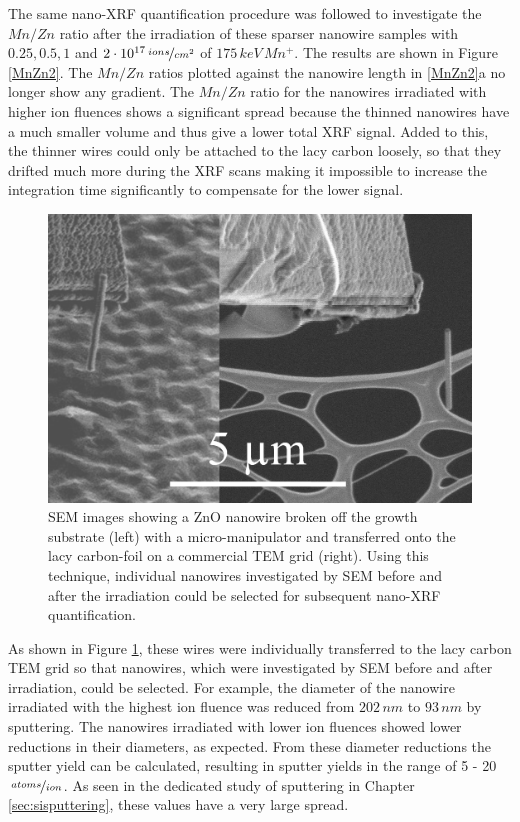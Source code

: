 The same nano-XRF quantification procedure was followed to investigate the $Mn/Zn$ ratio after the irradiation of these sparser nanowire samples with $0.25, 0.5, 1$ and $2\cdot 10^{17}\,\nicefrac{ions}{cm^2}$ of $175\,keV\,Mn^+$. The results are shown in Figure \ref{MnZn2}. The $Mn/Zn$ ratios plotted against the nanowire length in \ref{MnZn2}a no longer show any gradient. The $Mn/Zn$ ratio for the nanowires irradiated with higher ion fluences shows a significant spread because the thinned nanowires have a much smaller volume and thus give a lower total XRF signal. Added to this, the thinner wires could only be attached to the lacy carbon loosely, so that they drifted much more during the XRF scans making it impossible to increase the integration time significantly to compensate for the lower signal. 

\begin{figure}
	\centering
		\includegraphics[width=.5\textwidth]{images/SEMbreak.png}
	\caption{SEM images showing a ZnO nanowire broken off the growth substrate (left) with a micro-manipulator and transferred onto the lacy carbon-foil on a commercial TEM grid (right). Using this technique, individual nanowires investigated by SEM before and after the irradiation could be selected for subsequent nano-XRF quantification.}
	\label{SEMbreak}
\end{figure}

As shown in Figure \ref{SEMbreak}, these wires were individually transferred to the lacy carbon TEM grid so that nanowires, which were investigated by SEM before and after irradiation, could be selected. For example, the diameter of the nanowire irradiated with the highest ion fluence was reduced from $202\,nm$ to $93\,nm$ by sputtering. The nanowires irradiated with lower ion fluences showed lower reductions in their diameters, as expected. From these diameter reductions the sputter yield can be calculated, resulting in sputter yields in the range of 5 - 20$\,\nicefrac{atoms}{ion}$. As seen in the dedicated study of sputtering in Chapter \ref{sec:sisputtering}, these values have a very large spread. 

